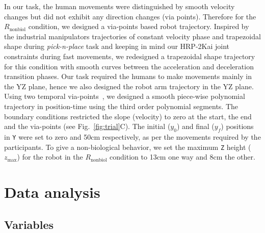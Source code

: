In our task, the human movements were distinguished by smooth velocity changes but did not exhibit any direction changes (via points). Therefore for the $R_{\text{nonbiol}}$ condition, we designed a via-points based robot trajectory. Inspired by the industrial manipulators trajectories of constant velocity phase and trapezoidal shape during {\it pick-n-place} task and keeping in mind our HRP-2Kai joint constraints during fast movements, we redesigned a trapezoidal shape trajectory for this condition with smooth curves between the acceleration and deceleration transition phases. Our task required the humans to make movements mainly in the YZ plane, hence we also designed the robot arm trajectory in the YZ plane. Using two temporal via-points~\cite{Biagiotti:Springer:2008}, we designed a smooth piece-wise polynomial trajectory in position-time using the third order polynomial segments. The boundary conditions restricted the slope (velocity) to zero at the start, the end and the via-points (see Fig.~\ref{fig:trial}C). The initial ($y_0$) and final ($y_f$) positions in \texttt{Y} were set to zero and 50cm respectively, as per the movements required by the participants. To give a non-biological behavior, we set the maximum \texttt{Z} height ($z_{\max}$) for the robot in the $R_{\text{nonbiol}}$ condition to 13cm one way and 8cm the other. 




\section{Data analysis}

\subsection{Variables}

